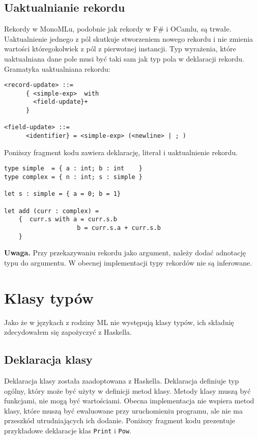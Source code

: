 \documentclass[declaration,shortabstract]{iithesis}
\begin{document}
\subsection{Uaktualnianie rekordu}

Rekordy w MonoMLu, podobnie jak rekordy w F\# i OCamlu, 
są trwałe. 
Uaktualnienie jednego z pól skutkuje stworzeniem nowego rekordu i nie zmienia 
wartości któregokolwiek z pól z pierwotnej instancji. 
Typ wyrażenia, które uaktualniana dane pole musi być taki sam jak typ pola 
w deklaracji rekordu.
Gramatyka uaktualniana rekordu:
\begin{lstlisting}[frame=lines]
<record-update> ::=
      { <simple-exp>  with 
        <field-update}+ 
      }

<field-update> ::=
      <identifier} = <simple-exp> (<newline> | ; )
\end{lstlisting}

Poniższy fragment kodu zawiera deklarację, literał i uaktualnienie rekordu.

\begin{lstlisting}[frame=lines]
type simple  = { a : int; b : int    }
type complex = { n : int; s : simple }

let s : simple = { a = 0; b = 1}

let add (curr : complex) = 
    {  curr.s with a = curr.s.b
                    b = curr.s.a + curr.s.b 
    }
\end{lstlisting}

\textbf{Uwaga.} Przy przekazywaniu rekordu jako argument, należy dodać 
adnotację typu do argumentu. W obecnej implementacji typy rekordów nie są 
inferowane.

\section{Klasy typów}

Jako że w językach z rodziny ML nie występują klasy typów, ich składnię
zdecydowałem się zapożyczyć z Haskella.

\subsection{Deklaracja klasy}

Deklaracja klasy została zaadoptowana z Haskella. Deklaracja 
definiuje typ ogólny, który może być użyty w definicji metod klasy.
Metody klasy muszą być funkcjami, nie mogą być wartościami. Obecna implementacja
nie wspiera metod klasy, które muszą być ewaluowane przy uruchomieniu programu, 
ale nie ma przeszkód utrudniających ich dodanie.
Poniższy fragment kodu prezentuje przykładowe deklaracje 
klas \texttt{Print} i \texttt{Pow}.
\end{document}
